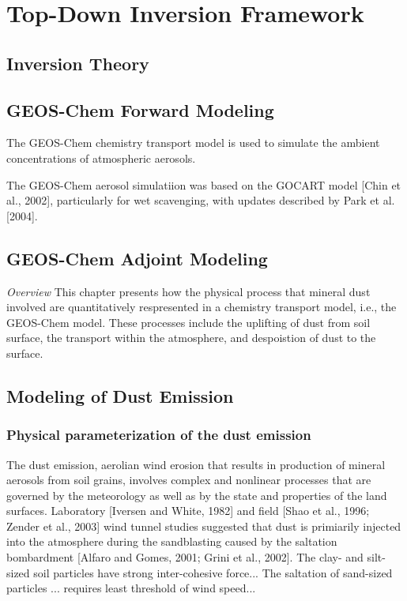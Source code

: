 \chapter{Top-Down Inversion Framework}

\section{Inversion Theory}

\section{GEOS-Chem Forward Modeling}

The GEOS-Chem chemistry transport model is used to simulate the ambient concentrations 
of atmospheric aerosols.

The GEOS-Chem aerosol simulatiion was based on the GOCART model [Chin et al., 2002], 
particularly for wet scavenging, with updates described by Park et al. [2004]. 

\section{GEOS-Chem Adjoint Modeling}



 \textit{Overview} \hspace{0.2cm} 
 This chapter presents how the physical process that mineral dust 
 involved are quantitatively respresented in a chemistry transport model, i.e., 
 the GEOS-Chem model. These processes include the uplifting of dust from soil surface, 
 the transport within the atmosphere, and despoistion of dust to the surface. 

\section{Modeling of Dust Emission}

\subsection{Physical parameterization of the dust emission}

  The dust emission, aerolian wind erosion that results in production of mineral aerosols
  from soil grains, involves complex and nonlinear processes that are governed by the 
  meteorology as well as by the state and properties of the land surfaces. Laboratory 
  [Iversen and White, 1982] and field [Shao et al., 1996; Zender et al., 2003] wind tunnel
  studies suggested that dust is primiarily injected into the atmosphere during the 
  sandblasting caused by the saltation bombardment [Alfaro and Gomes, 2001; Grini et al.,
  2002]. The clay- and silt-sized soil particles have strong inter-cohesive force... 
  The saltation of sand-sized particles ... requires least threshold of wind speed...


